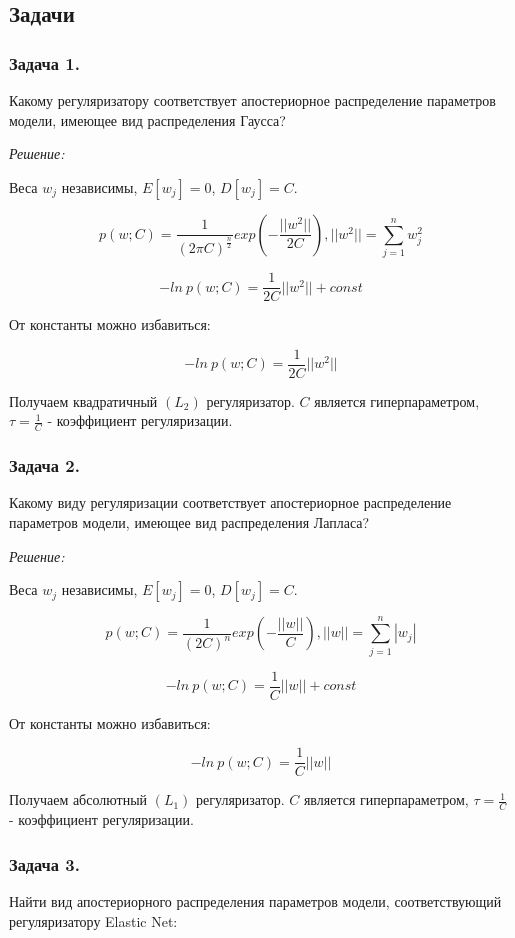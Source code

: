 \subsection{Задачи}

\subsubsection{Задача 1.}
Какому регуляризатору соответствует апостериорное распределение параметров модели, имеющее вид распределения Гаусса?

\textit{Решение:}

Веса \(w_{j}\) независимы, \(E[w_{j}]=0\), \(D[w_{j}]=C\).

\[
p(w;C) = \frac{1}{{(2\pi C)}^{\frac{n}{2}}}exp(-\frac{||w^2||}{2C}), ||w^2||=\sum_{j=1}^{n}{w_{j}^2}
\]

\[
-ln \ p(w;C)=\frac{1}{2C}||w^2|| + const
\]

От константы можно избавиться:

\[
-ln \ p(w;C)=\frac{1}{2C}||w^2||
\]

Получаем квадратичный \((L_{2})\) регуляризатор. \(C\) является гиперпараметром, \(\tau = \frac{1}{C}\) - коэффициент регуляризации.

\subsubsection{Задача 2.}
Какому виду регуляризации соответствует апостериорное распределение параметров модели, имеющее вид распределения Лапласа?

\textit{Решение:}

Веса \(w_{j}\) независимы, \(E[w_{j}]=0\), \(D[w_{j}]=C\).

\[
p(w;C) = \frac{1}{{(2C)}^{n}}exp(-\frac{||w||}{C}), ||w||=\sum_{j=1}^{n}{|w_{j}|}
\]

\[
-ln \ p(w;C)=\frac{1}{C}||w|| + const
\]

От константы можно избавиться:

\[
-ln \ p(w;C)=\frac{1}{C}||w||
\]

Получаем абсолютный \((L_{1})\) регуляризатор. \(C\) является гиперпараметром, \(\tau = \frac{1}{C}\) - коэффициент регуляризации.

\subsubsection{Задача 3.}
Найти вид апостериорного распределения параметров модели, соответствующий регуляризатору Elastic Net:

